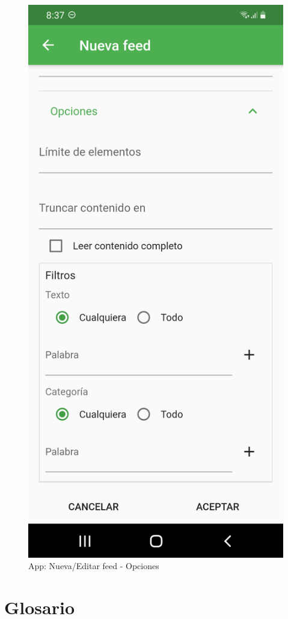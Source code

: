 \documentclass[11pt,spanish,listoffigures,listoftables,table,hyphens,dvipsnames]{tfgetsinf}
\begin{document}
\begin{figure}[ht]
   \centering
   \includegraphics[width=.74\textwidth]{app-editar-feed-opciones.jpg}
   \caption{App: Nueva/Editar feed - Opciones}
   \label{figura:app-editar-feed-opciones}
\end{figure}


\chapter{Glosario}
\label{glosario}
\end{document}
